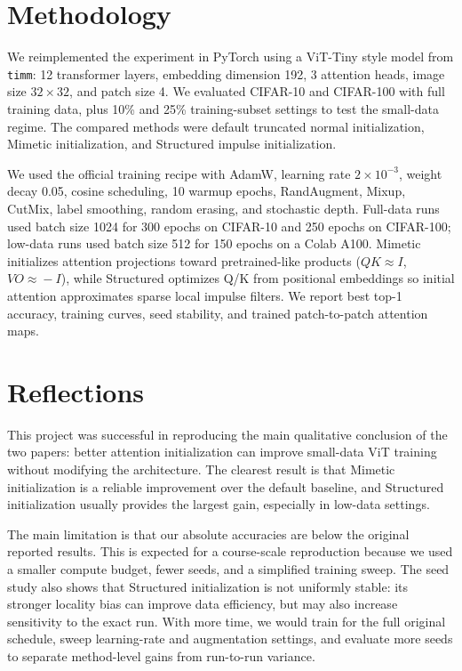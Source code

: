 \documentclass[11pt]{article}
\begin{document}
\section{Methodology}
We reimplemented the experiment in PyTorch using a ViT-Tiny style model from
\texttt{timm}: 12 transformer layers, embedding dimension 192, 3 attention
heads, image size $32\times32$, and patch size 4.  We evaluated CIFAR-10 and
CIFAR-100 with full training data, plus 10\% and 25\% training-subset settings
to test the small-data regime.  The compared methods were default truncated
normal initialization, Mimetic initialization, and Structured impulse
initialization.

We used the official training recipe with AdamW, learning rate $2\times10^{-3}$,
weight decay 0.05, cosine scheduling, 10 warmup epochs, RandAugment, Mixup,
CutMix, label smoothing, random erasing, and stochastic depth.  Full-data runs
used batch size 1024 for 300 epochs on CIFAR-10 and 250 epochs on CIFAR-100;
low-data runs used batch size 512 for 150 epochs on a Colab A100.  Mimetic
initializes attention projections toward pretrained-like products
($QK\!\approx\!I$, $VO\!\approx\!-I$), while Structured optimizes Q/K from
positional embeddings so initial attention approximates sparse local impulse
filters.  We report best top-1 accuracy, training curves, seed stability, and
trained patch-to-patch attention maps.



\section{Reflections}
This project was successful in reproducing the main qualitative conclusion of
the two papers: better attention initialization can improve small-data ViT
training without modifying the architecture.  The clearest result is that
Mimetic initialization is a reliable improvement over the default baseline, and
Structured initialization usually provides the largest gain, especially in
low-data settings.

The main limitation is that our absolute accuracies are below the original
reported results.  This is expected for a course-scale reproduction because we
used a smaller compute budget, fewer seeds, and a simplified training sweep.
The seed study also shows that Structured initialization is not uniformly stable:
its stronger locality bias can improve data efficiency, but may also increase
sensitivity to the exact run.  With more time, we would train for the full
original schedule, sweep learning-rate and augmentation settings, and evaluate
more seeds to separate method-level gains from run-to-run variance.
\end{document}

